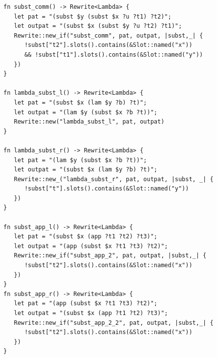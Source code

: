 \begin{listing*}
	\centering
	\begin{minipage}{0.8\textwidth}
		\begin{verbatim}
fn subst_comm() -> Rewrite<Lambda> {
   let pat = "(subst $y (subst $x ?u ?t1) ?t2)";
   let outpat = "(subst $x (subst $y ?u ?t2) ?t1)";
   Rewrite::new_if("subst_comm", pat, outpat, |subst,_| {
      !subst["t2"].slots().contains(&Slot::named("x")) 
      && !subst["t1"].slots().contains(&Slot::named("y"))
   })
}

fn lambda_subst_l() -> Rewrite<Lambda> {
   let pat = "(subst $x (lam $y ?b) ?t)";
   let outpat = "(lam $y (subst $x ?b ?t))";
   Rewrite::new("lambda_subst_l", pat, outpat)
}

fn lambda_subst_r() -> Rewrite<Lambda> {
   let pat = "(lam $y (subst $x ?b ?t))";
   let outpat = "(subst $x (lam $y ?b) ?t)";
   Rewrite::new_("lambda_subst_r", pat, outpat, |subst, _| {
      !subst["t"].slots().contains(&Slot::named("y"))
   })
}

fn subst_app_l() -> Rewrite<Lambda> {
   let pat = "(subst $x (app ?t1 ?t2) ?t3)";
   let outpat = "(app (subst $x ?t1 ?t3) ?t2)";
   Rewrite::new_if("subst_app_2", pat, outpat, |subst,_| {
      !subst["t2"].slots().contains(&Slot::named("x"))
   })
}
fn subst_app_r() -> Rewrite<Lambda> {
   let pat = "(app (subst $x ?t1 ?t3) ?t2)";
   let outpat = "(subst $x (app ?t1 ?t2) ?t3)";
   Rewrite::new_if("subst_app_2_2", pat, outpat, |subst,_| {
      !subst["t2"].slots().contains(&Slot::named("x"))
   })
}
	\end{verbatim}
	\end{minipage}
	\caption{Graphical equivalence rules for $\lambda_{\text{lsub}}$}
	\label{listing:graphical_equivalence}
\end{listing*}




